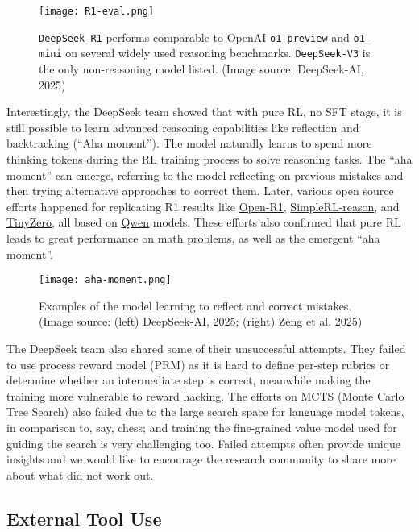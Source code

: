 \documentclass[12pt]{article}
\begin{document}
\begin{figure}[h]
    \centering
    \texttt{[image: R1-eval.png]}
    \caption{\texttt{DeepSeek-R1} performs comparable to OpenAI \texttt{o1-preview} and \texttt{o1-mini} on several widely used reasoning benchmarks. \texttt{DeepSeek-V3} is the only non-reasoning model listed. (Image source: DeepSeek-AI, 2025)}
\end{figure}

Interestingly, the DeepSeek team showed that with pure RL, no SFT stage, it is still possible to learn advanced reasoning capabilities like reflection and backtracking (``Aha moment''). The model naturally learns to spend more thinking tokens during the RL training process to solve reasoning tasks. The ``aha moment'' can emerge, referring to the model reflecting on previous mistakes and then trying alternative approaches to correct them. Later, various open source efforts happened for replicating R1 results like \href{https://github.com/huggingface/open-r1}{Open-R1}, \href{https://github.com/hkust-nlp/simpleRL-reason}{SimpleRL-reason}, and \href{https://github.com/Jiayi-Pan/TinyZero}{TinyZero}, all based on \href{https://github.com/QwenLM/Qwen2.5}{Qwen} models. These efforts also confirmed that pure RL leads to great performance on math problems, as well as the emergent ``aha moment''.

\begin{figure}[h]
    \centering
    \texttt{[image: aha-moment.png]}
    \caption{Examples of the model learning to reflect and correct mistakes. (Image source: (left) DeepSeek-AI, 2025; (right) Zeng et al. 2025)}
\end{figure}

The DeepSeek team also shared some of their unsuccessful attempts. They failed to use process reward model (PRM) as it is hard to define per-step rubrics or determine whether an intermediate step is correct, meanwhile making the training more vulnerable to reward hacking. The efforts on MCTS (Monte Carlo Tree Search) also failed due to the large search space for language model tokens, in comparison to, say, chess; and training the fine-grained value model used for guiding the search is very challenging too. Failed attempts often provide unique insights and we would like to encourage the research community to share more about what did not work out.


\subsection{External Tool Use}
\end{document}
